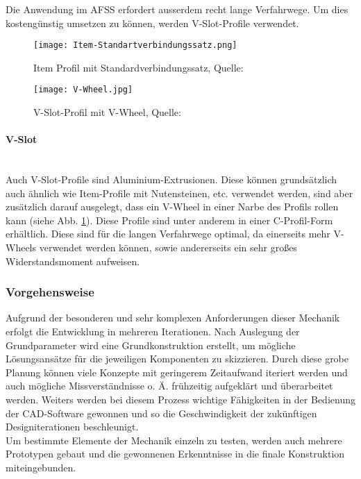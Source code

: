 Die Anwendung im AFSS erfordert ausserdem recht lange Verfahrwege. Um dies kostengünstig umsetzen zu können, werden V-Slot-Profile verwendet.

\begin{figure}[H]
    \begin{minipage}{0.5\textwidth}
        \centering
        \texttt{[image: Item-Standartverbindungssatz.png]}
        \caption{Item Profil mit Standardverbindungssatz, Quelle: \cite{Item_svs}}
        \label{sfs_item}
    \end{minipage}%
    \begin{minipage}{0.5\textwidth}
        \centering
        \texttt{[image: V-Wheel.jpg]}
        \caption{V-Slot-Profil mit V-Wheel, Quelle: \cite{v_slot_wheel}}
        \label{v-wheel}
    \end{minipage}
\end{figure}


\paragraph{V-Slot}\mbox{}\\
Auch V-Slot-Profile sind Aluminium-Extrusionen. Diese können grundsätzlich auch ähnlich wie Item-Profile mit Nutensteinen, etc. verwendet werden, sind aber zusätzlich darauf ausgelegt, dass ein V-Wheel in einer Narbe des Profils rollen kann (siehe Abb. \ref{v-wheel}). Diese Profile sind unter anderem in einer C-Profil-Form erhältlich. Diese sind für die langen Verfahrwege optimal, da einerseits mehr V-Wheels verwendet werden können, sowie andererseits ein sehr großes Widerstandsmoment aufweisen.


\subsubsection{Vorgehensweise}
Aufgrund der besonderen und sehr komplexen Anforderungen dieser Mechanik erfolgt die Entwicklung in mehreren Iterationen. Nach Auslegung der Grundparameter wird eine Grundkonstruktion erstellt, um mögliche Lösungsansätze für die jeweiligen Komponenten zu skizzieren. Durch diese grobe Planung können viele Konzepte mit geringerem Zeitaufwand iteriert werden und auch mögliche Missverständnisse o. Ä. frühzeitig aufgeklärt und überarbeitet werden. Weiters werden bei diesem Prozess wichtige Fähigkeiten in der Bedienung der CAD-Software gewonnen und so die Geschwindigkeit der zukünftigen Designiterationen beschleunigt.\\
Um bestimmte Elemente der Mechanik einzeln zu testen, werden auch mehrere Prototypen gebaut und die gewonnenen Erkenntnisse in die finale Konstruktion miteingebunden.\\

